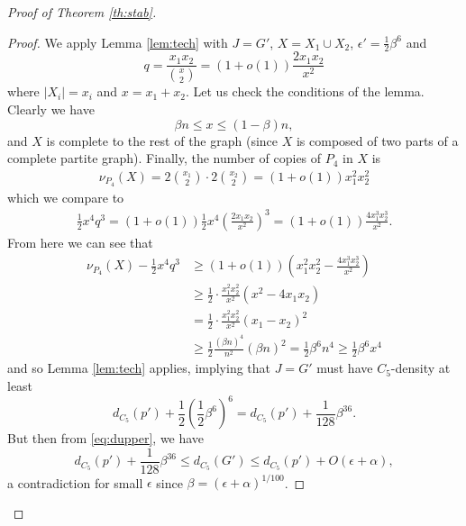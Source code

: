 \documentclass[12pt]{article}
\newcommand{\rbrac}[1]{\left( #1 \right)}
\newcommand{\eps}{\epsilon}
\renewcommand{\a}{\alpha}
\renewcommand{\b}{\beta}
\theoremstyle{definition}
\theoremstyle{remark}
\renewcommand{\ge}{\geqslant}
\renewcommand{\le}{\leqslant}
\begin{document}
\begin{proof}[Proof of Theorem \ref{th:stab}]
\begin{proof}
We apply Lemma \ref{lem:tech} with $J=G'$, $X=X_1 \cup X_2$, $\eps' = \frac12 \b^6$ and $$q = \frac{x_1 x_2}{\binom{x}{2}} = (1+o(1))\frac{2 x_1 x_2}{x^2} $$ where $|X_i|=x_i$ and $x=x_1+x_2$. 
Let us check the conditions of the lemma. Clearly we have 
\[
\b n \le x \le (1-\b)n,
\]
and $X$ is complete to the rest of the graph (since $X$ is composed of two parts of a complete partite graph). Finally, the number of copies of $P_4$ in $X$ is 
\begin{align*}
\nu_{P_4}(X) = 2 \binom{x_1}{2} \cdot 2 \binom{x_2}{2} = (1+o(1))x_1^2 x_2^2
\end{align*}
which we compare to 
\begin{align*}
\frac 12 x^4 q^3 = (1+o(1)) \frac 12 x^4 \rbrac{\frac{2 x_1 x_2}{x^2}}^3= (1+o(1)) \frac{4x_1^3 x_2^3}{x^2}.
\end{align*}
From here we can see that 
\begin{align*}
\nu_{P_4}(X) - \frac 12 x^4 q^3 & \ge (1+o(1))\rbrac{x_1^2 x_2^2 - \frac{4x_1^3 x_2^3}{x^2}} \\
& \ge \frac12 \cdot \frac{x_1^2x_2^2}{x^2} (x^2 - 4x_1x_2) \\
& = \frac12 \cdot \frac{x_1^2x_2^2}{x^2} (x_1-x_2)^2 \\
&\ge \frac12 \frac{(\b n)^4}{n^2} (\b n)^2 = \frac12 \b^6 n^4 \ge \frac12 \b^6 x^4
\end{align*}
and so Lemma \ref{lem:tech} applies, implying that $J=G'$ must have $C_5$-density at least $$d_{C_5}(p') + \frac12 \rbrac{\frac12 \b^6}^6 = d_{C_5}(p') + \frac1{128} \b^{36}.$$ But then from \eqref{eq:dupper}, we have 
\[
d_{C_5}(p') + \frac1{128} \b^{36} \le d_{C_5}(G') \le d_{C_5}(p')+  O(\eps + \a),
\]
a contradiction for small $\eps$ since $\b =  (\eps+\a)^{1/100}$.
\end{proof} 


\end{proof}
\end{document}

